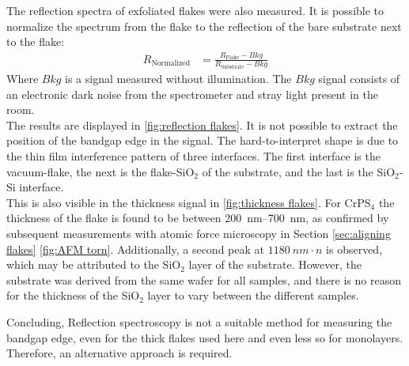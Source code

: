 \documentclass[
	twoside,
	parskip=half,
	a4paper,
]{scrbook}
\begin{document}
The reflection spectra of exfoliated flakes were also measured.
It is possible to normalize the spectrum from the flake to the reflection of the bare substrate next to the flake:
\begin{align}
	R_\text{Normalized} &= \frac{R_\text{Flake} - Bkg}{R_\text{Substrate} - Bkg}
\end{align}
Where $Bkg$ is a signal measured without illumination. 
The $Bkg$ signal consists of an electronic dark noise from the spectrometer and stray light present in the room.\\
The results are displayed in \autoref{fig:reflection flakes}.
It is not possible to extract the position of the bandgap edge in the signal.
The hard-to-interpret shape is due to the thin film interference pattern of three interfaces.
The first interface is the vacuum-flake, the next is the flake-SiO$_2$ of the substrate, and the last is the SiO$_2$-Si interface.\\
This is also visible in the thickness signal in \autoref{fig:thickness flakes}.
For CrPS$_4$ the thickness of the flake is found to be between \SIrange{200}{700}{nm}, as confirmed by subsequent measurements with atomic force microscopy in Section \ref{sec:aligning flakes} \autoref{fig:AFM torn}.
Additionally, a second peak at $\SI{1180}{nm}\cdot n$ is observed, which may be attributed to the SiO$_2$ layer of the substrate. 
However, the substrate was derived from the same wafer for all samples, and there is no reason for the thickness of the SiO$_2$ layer to vary between the different samples.

Concluding, Reflection spectroscopy is not a suitable method for measuring the bandgap edge, even for the thick flakes used here and even less so for monolayers. 
Therefore, an alternative approach is required.
\end{document}
